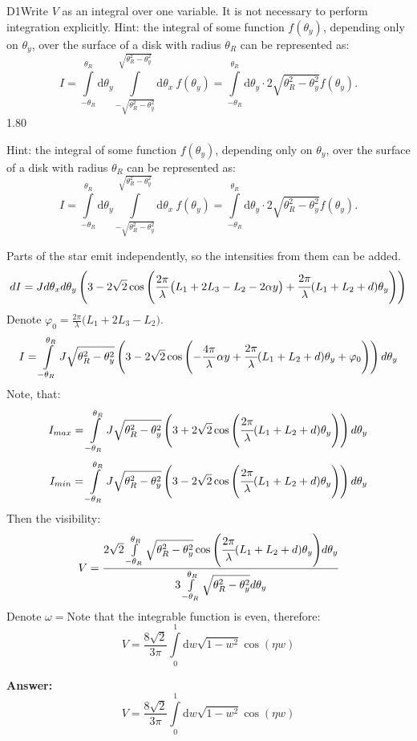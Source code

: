 \documentclass[11pt,a4paper]{article}
\begin{document}
\begin{solcard}{D1}{Write $V$ as an integral over one variable. It is not necessary to perform integration explicitly. Hint: the integral of some function $f(\theta_y)$, depending only on $\theta_y$, over the surface of a disk with radius $\theta_R$ can be represented as: \[I=\int\limits_{-\theta_R}^{\theta_R}\mathrm d\theta_y\int\limits_{-\sqrt{\theta^2_R-\theta^2_y}}^{\sqrt{\theta^2_R-\theta^2_y}}\mathrm d\theta_x~f(\theta_y)=\int\limits_{-\theta_R}^{\theta_R}\mathrm d\theta_y\cdot 2\sqrt{\theta^2_R-\theta^2_y}f(\theta_y).\]}{1.80}

Hint: the integral of some function $f(\theta_y)$, depending only on $\theta_y$, over the surface of a disk with radius $\theta_R$ can be represented as: \[I=\int\limits_{-\theta_R}^{\theta_R}\mathrm d\theta_y\int\limits_{-\sqrt{\theta^2_R-\theta^2_y}}^{\sqrt{\theta^2_R-\theta^2_y}}\mathrm d\theta_x~f(\theta_y)=\int\limits_{-\theta_R}^{\theta_R}\mathrm d\theta_y\cdot 2\sqrt{\theta^2_R-\theta^2_y}f(\theta_y).\]


Parts of the star emit independently, so the intensities from them can be added. $$dI = J d\theta_x d\theta_y\left(3 - 2\sqrt{2}\cos{\left(\frac{2\pi}\lambda\big(L_1+2L_3-L_2-2\alpha y\big)+\cfrac{2\pi}{\lambda}(L_1 + L_2 + d) \theta_y\right)}\right)$$Denote $\varphi_0 = \frac{2\pi}\lambda\big(L_1+2L_3-L_2\big)$. $$I = \int\limits_{-\theta_R}^{\theta_R} J\sqrt{\theta^2_R - \theta^2_y}\left(3 - 2\sqrt{2}\cos{\left(-\frac{4\pi}\lambda\alpha y+\cfrac{2\pi}{\lambda}(L_1 + L_2+d) \theta_y + \varphi_0\right)}\right)d\theta_y$$Note, that: $$I_{max} = \int\limits_{-\theta_R}^{\theta_R} J\sqrt{\theta^2_R - \theta^2_y}\left(3 + 2\sqrt{2}\cos{\left(\cfrac{2\pi}{\lambda}(L_1 + L_2 + d) \theta_y\right)}\right)d\theta_y$$$$I_{min} = \int\limits_{-\theta_R}^{\theta_R} J\sqrt{\theta^2_R - \theta^2_y}\left(3 - 2\sqrt{2}\cos{\left(\cfrac{2\pi}{\lambda}(L_1 + L_2 + d) \theta_y\right)}\right)d\theta_y$$Then the visibility: $$V = \cfrac{2\sqrt{2}\int\limits_{-\theta_R}^{\theta_R} \sqrt{\theta^2_R - \theta^2_y}\cos{\left(\cfrac{2\pi}{\lambda}(L_1 + L_2 + d) \theta_y\right)}d\theta_y}{3\int\limits_{-\theta_R}^{\theta_R} \sqrt{\theta^2_R - \theta^2_y}d\theta_y}$$Denote $\omega = $Note that the integrable function is even, therefore: \[V=\frac{8\sqrt2}{3\pi}\int\limits_0^1\mathrm dw\sqrt{1-w^2}\cos(\eta w)\]

\par\smallskip\noindent\textbf{Answer:} \[V=\frac{8\sqrt2}{3\pi}\int\limits_0^1\mathrm dw\sqrt{1-w^2}\cos(\eta w)\]
\end{solcard}
\end{document}
